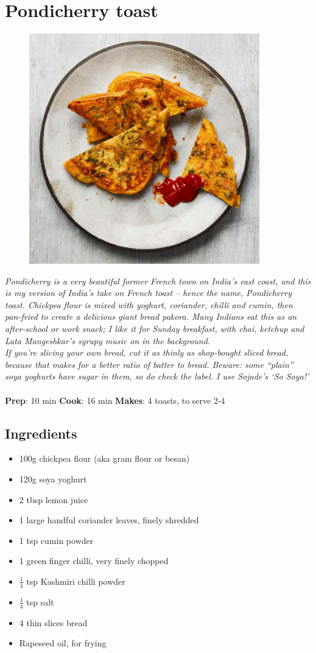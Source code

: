 \documentclass{book}
\begin{document}
\section{Pondicherry toast}
\begin{figure}
\centering\includegraphics[width=10cm,height=10cm,keepaspectratio]{Recipe_Pictures/Pondicherry_toast.png}
\end{figure}
\emph{Pondicherry is a very beautiful former French town on India’s east coast, and this is my version of India’s take on French toast – hence the name, Pondicherry toast. Chickpea flour is mixed with yoghurt, coriander, chilli and cumin, then pan-fried to create a delicious giant bread pakora. Many Indians eat this as an after-school or work snack; I like it for Sunday breakfast, with chai, ketchup and Lata Mangeshkar’s syrupy music on in the background.\\ 
If you’re slicing your own bread, cut it as thinly as shop-bought sliced bread, because that makes for a better ratio of batter to bread. Beware: some “plain” soya yoghurts have sugar in them, so do check the label. I use Sojade’s ‘So Soya!’}\\\\ 
\textbf{Prep}: 10 min
\textbf{Cook}: 16 min
\textbf{Makes}: 4 toasts, to serve 2-4
\subsection*{Ingredients}
\begin{itemize}
\item 100g chickpea flour (aka gram flour or besan) 
\item 120g soya yoghurt
\item 2 tbsp lemon juice
\item 1 large handful coriander leaves, finely shredded 
\item 1 tsp cumin powder 
\item 1 green finger chilli, very finely chopped
\item $\frac{1}{4}$ tsp Kashmiri chilli powder
\item $\frac{1}{4}$ tsp salt 
\item 4 thin slices bread
\item Rapeseed oil, for frying
\end{itemize}
\end{document}
